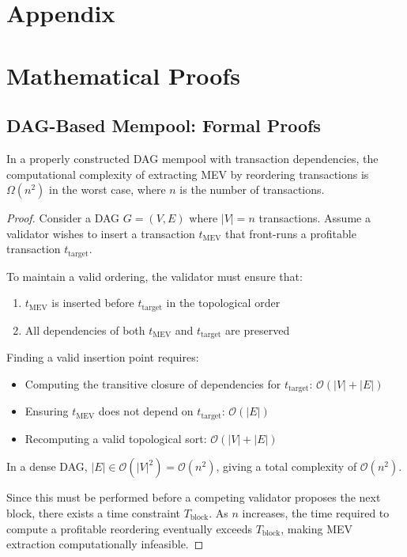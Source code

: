 \documentclass[12pt]{article}
\begin{document}
\clearpage

\appendix

\section*{Appendix}

\section{Mathematical Proofs}
\subsection{DAG-Based Mempool: Formal Proofs}

\begin{theorem}
In a properly constructed DAG mempool with transaction dependencies, the computational complexity of extracting MEV by reordering transactions is $\Omega(n^2)$ in the worst case, where $n$ is the number of transactions.
\end{theorem}

\begin{proof}
Consider a DAG $G = (V, E)$ where $|V| = n$ transactions. Assume a validator wishes to insert a transaction $t_{\text{MEV}}$ that front-runs a profitable transaction $t_{\text{target}}$.

To maintain a valid ordering, the validator must ensure that:
\begin{enumerate}
\item $t_{\text{MEV}}$ is inserted before $t_{\text{target}}$ in the topological order
\item All dependencies of both $t_{\text{MEV}}$ and $t_{\text{target}}$ are preserved
\end{enumerate}

Finding a valid insertion point requires:
\begin{itemize}
\item Computing the transitive closure of dependencies for $t_{\text{target}}$: $\mathcal{O}(|V| + |E|)$
\item Ensuring $t_{\text{MEV}}$ does not depend on $t_{\text{target}}$: $\mathcal{O}(|E|)$
\item Recomputing a valid topological sort: $\mathcal{O}(|V| + |E|)$
\end{itemize}

In a dense DAG, $|E| \in \mathcal{O}(|V|^2) = \mathcal{O}(n^2)$, giving a total complexity of $\mathcal{O}(n^2)$. 

Since this must be performed before a competing validator proposes the next block, there exists a time constraint $T_{\text{block}}$. As $n$ increases, the time required to compute a profitable reordering eventually exceeds $T_{\text{block}}$, making MEV extraction computationally infeasible.
\end{proof}
\end{document}
